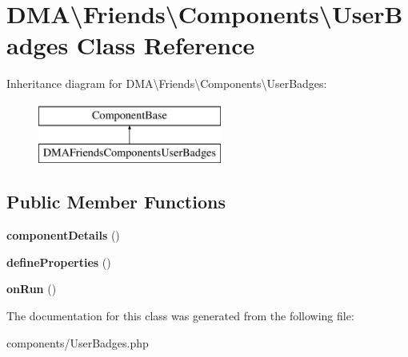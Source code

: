 \hypertarget{classDMA_1_1Friends_1_1Components_1_1UserBadges}{\section{D\+M\+A\textbackslash{}Friends\textbackslash{}Components\textbackslash{}User\+Badges Class Reference}
\label{classDMA_1_1Friends_1_1Components_1_1UserBadges}
}
Inheritance diagram for D\+M\+A\textbackslash{}Friends\textbackslash{}Components\textbackslash{}User\+Badges\+:\begin{figure}[H]
\begin{center}
\leavevmode
\includegraphics[height=2.000000cm]{d8/d01/classDMA_1_1Friends_1_1Components_1_1UserBadges}
\end{center}
\end{figure}
\subsection*{Public Member Functions}
\begin{DoxyCompactItemize}
\item 
\hypertarget{classDMA_1_1Friends_1_1Components_1_1UserBadges_a6e3e13d8f4a57f8845f2c6371c8dbd58}{{\bfseries component\+Details} ()}\label{classDMA_1_1Friends_1_1Components_1_1UserBadges_a6e3e13d8f4a57f8845f2c6371c8dbd58}

\item 
\hypertarget{classDMA_1_1Friends_1_1Components_1_1UserBadges_aae166c2a0b03d1048472286433f21970}{{\bfseries define\+Properties} ()}\label{classDMA_1_1Friends_1_1Components_1_1UserBadges_aae166c2a0b03d1048472286433f21970}

\item 
\hypertarget{classDMA_1_1Friends_1_1Components_1_1UserBadges_acec1de754996d056cdc99efa976826b9}{{\bfseries on\+Run} ()}\label{classDMA_1_1Friends_1_1Components_1_1UserBadges_acec1de754996d056cdc99efa976826b9}

\end{DoxyCompactItemize}


The documentation for this class was generated from the following file\+:\begin{DoxyCompactItemize}
\item 
components/User\+Badges.\+php\end{DoxyCompactItemize}
